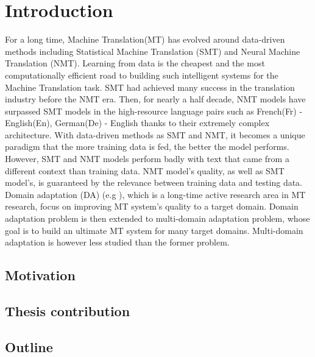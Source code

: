 \chapter{Introduction}
For a long time, Machine Translation(MT) has evolved around data-driven methods including Statistical Machine Translation (SMT) and Neural Machine Translation (NMT). Learning from data is the cheapest and the most computationally efficient road to building such intelligent systems for the Machine Translation task. SMT had achieved many success in the translation industry before the NMT era. Then, for nearly a half decade, NMT models have surpassed SMT models in the high-resource language pairs such as French(Fr) - English(En), German(De) - English thanks to their extremely complex architecture. With data-driven methods as SMT and NMT, it becomes a unique paradigm that the more training data is fed, the better the model performs. However, SMT and NMT models perform badly with text that came from a different context than training data. NMT model's quality, as well as SMT model's, is guaranteed by the relevance between training data and testing data. Domain adaptation (DA) (e.g \cite{Rico13domain}), which is a long-time active research area in MT research, focus on improving MT system's quality to a target domain. Domain adaptation problem is then extended to multi-domain adaptation problem, whose goal is to build an ultimate MT system for many target domains. Multi-domain adaptation is however less studied than the former problem. 
\section{Motivation}

\section{Thesis contribution}

\section{Outline}